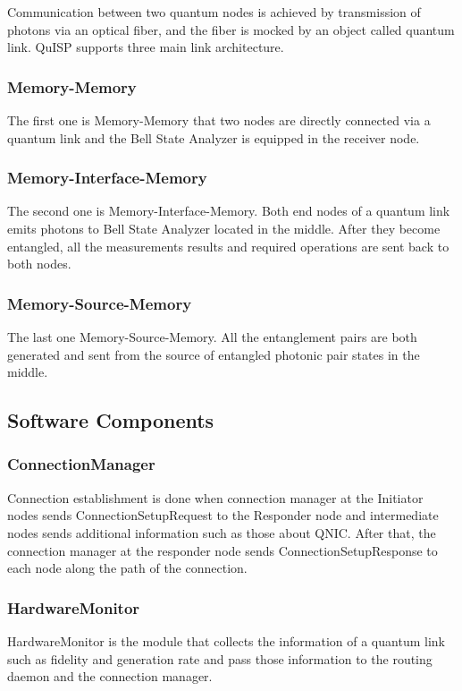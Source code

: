 Communication between two quantum nodes is achieved by transmission of photons via an optical fiber, and the fiber is mocked by an object called quantum link.
QuISP supports three main link architecture. 

\subsubsection{Memory-Memory}
The first one is Memory-Memory that two nodes are directly connected via a quantum link and the Bell State Analyzer is equipped in the receiver node.

\subsubsection{Memory-Interface-Memory}
The second one is Memory-Interface-Memory. Both end nodes of a quantum link emits photons to Bell State Analyzer located in the middle. After they become entangled, all the measurements results and required operations are sent back to both nodes.

\subsubsection{Memory-Source-Memory}
The last one Memory-Source-Memory. All the entanglement pairs are both generated and sent from the source of entangled photonic pair states in the middle.

\subsection{Software Components}

\subsubsection{ConnectionManager}

Connection establishment is done when connection manager at the Initiator nodes sends ConnectionSetupRequest to the Responder node and intermediate nodes sends additional information such as those about QNIC.
After that, the connection manager at the responder node sends ConnectionSetupResponse to each node along the path of the connection.

\subsubsection{HardwareMonitor}
HardwareMonitor is the module that collects the information of a quantum link such as fidelity and generation rate and pass those information to the routing daemon and the connection manager.

